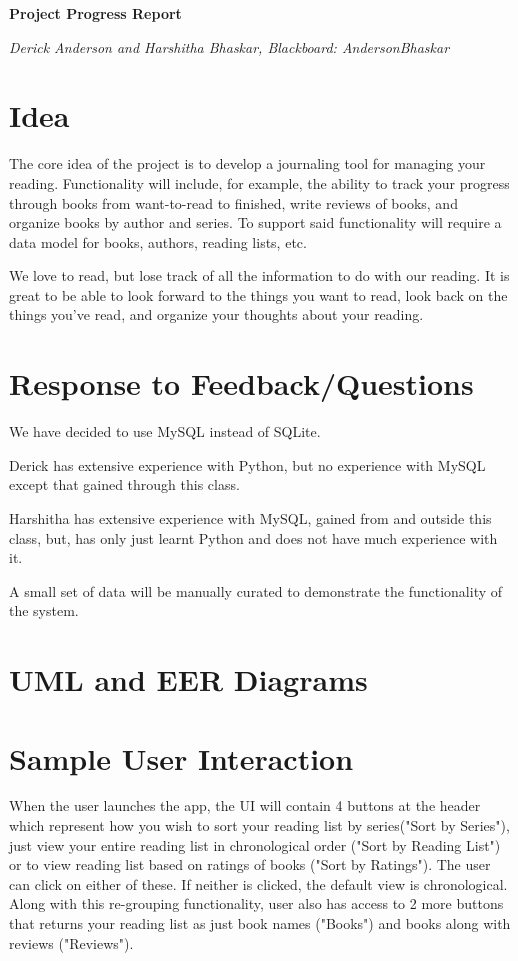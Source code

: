 \documentclass{article}
\begin{document}

\begin{center}
  \textbf{Project Progress Report}

  \textit{Derick Anderson and Harshitha Bhaskar, Blackboard: AndersonBhaskar}
\end{center}

\section*{Idea}

The core idea of the project is to develop a journaling tool for managing your
reading. Functionality will include, for example, the ability to track your
progress through books from want-to-read to finished, write reviews of books,
and organize books by author and series. To support said functionality will
require a data model for books, authors, reading lists, etc.

We love to read, but lose track of all the information to do with our
reading. It is great to be able to look forward to the things you want to read,
look back on the things you’ve read, and organize your thoughts about your
reading.

\section*{Response to Feedback/Questions}

We have decided to use MySQL instead of SQLite.

Derick has extensive experience with Python,
but no experience with MySQL
except that gained through this class.

Harshitha has extensive experience with MySQL, gained from and outside this class, 
but, has only just learnt Python and does not have much experience with it.

A small set of data will be manually curated to demonstrate the functionality of
the system.

\section*{UML and EER Diagrams}

\section*{Sample User Interaction}

When the user launches the app, the UI will contain 4 buttons at the header which 
represent how you wish to sort your reading list by series("Sort by Series"), just 
view your entire reading list in chronological order ("Sort by Reading List") or 
to view reading list based on ratings of books ("Sort by Ratings"). The user can 
click on either of these. If neither is clicked, the default view is chronological. 
Along with this re-grouping functionality, user also has access to 2 more buttons 
that returns your reading list as just book names ("Books") and books along with 
reviews ("Reviews").
\end{document}
